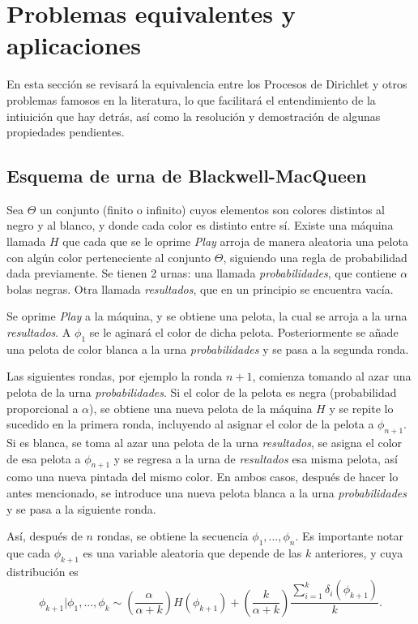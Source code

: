 \section{Problemas equivalentes y aplicaciones}

En esta secci\'on se revisar\'a la equivalencia entre los Procesos de Dirichlet y otros problemas famosos en la literatura, lo que facilitar\'a el entendimiento de la intiuici\'on que hay detr\'as, as\'i como la resoluci\'on y demostraci\'on de algunas propiedades pendientes.

\subsection{Esquema de urna de Blackwell-MacQueen}

Sea $\Theta$ un conjunto (finito o infinito) cuyos elementos son colores distintos al negro y al blanco, y donde cada color es distinto entre s\'i. Existe una m\'aquina llamada $H$ que cada que se le oprime \textit{Play} arroja de manera aleatoria una pelota con algún color perteneciente al conjunto $\Theta$, siguiendo una regla de probabilidad dada previamente. Se tienen 2 urnas: una llamada \textit{probabilidades}, que contiene $\alpha$ bolas negras. Otra llamada \textit{resultados}, que en un principio se encuentra vac\'ia. 

Se oprime \textit{Play} a la m\'aquina, y se obtiene una pelota, la cual se arroja a la urna \textit{resultados}. A $\phi_1$ se le aginar\'a el color de dicha pelota. Posteriormente se añade una pelota de color blanca a la urna \textit{probabilidades} y se pasa a la segunda ronda.  

Las siguientes rondas, por ejemplo la ronda $n+1$, comienza tomando al azar una pelota de la urna \textit{probabilidades}. Si el color de la pelota es negra (probabilidad proporcional a $\alpha$), se obtiene una nueva pelota de la m\'aquina $H$ y se repite lo sucedido en la primera ronda, incluyendo al asignar el color de la pelota a $\phi_{n+1}$. Si es blanca, se toma al azar una pelota de la urna \textit{resultados}, se asigna el color de esa pelota a $\phi_{n+1}$ y se regresa a la urna de \textit{resultados} esa misma pelota, as\'i como una nueva pintada del mismo color. En ambos casos, después de hacer lo antes mencionado, se introduce una nueva pelota blanca a la urna \textit{probabilidades} y se pasa a la siguiente ronda. 

Así, despu\'es de $n$ rondas, se obtiene la secuencia $\phi_1,...,\phi_n$. Es importante notar que cada $\phi_{k+1}$ es una variable aleatoria que depende de las $k$ anteriores, y cuya distribuci\'on es
\begin{equation*}
    \phi_{k+1}|\phi_1,...,\phi_k \sim 
    \left(\frac{\alpha}{\alpha + k}\right)H(\phi_{k+1}) + 
    \left(\frac{k}{\alpha + k}\right)\frac{\sum_{i=1}^k \delta_i(\phi_{k+1})}{k}.
\end{equation*}

